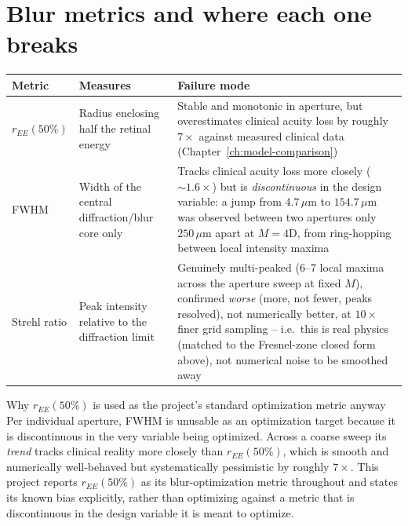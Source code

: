 \section{Blur metrics and where each one breaks}
\label{sec:blur-metrics}
\begin{center}
\begin{tabular}{p{2.6cm}p{4.8cm}p{6.0cm}}
\toprule
Metric & Measures & Failure mode \\
\midrule
$r_{EE}(50\%)$ & Radius enclosing half the retinal energy & Stable and monotonic in
aperture, but overestimates clinical acuity loss by roughly $7\times$ against measured
clinical data (Chapter~\ref{ch:model-comparison}) \\
FWHM & Width of the central diffraction/blur core only & Tracks clinical acuity loss
more closely ($\sim1.6\times$) but is \emph{discontinuous} in the design variable: a
jump from $4.7\,\mu$m to $154.7\,\mu$m was observed between two apertures only
$250\,\mu$m apart at $M=4$D, from ring-hopping between local intensity maxima \\
Strehl ratio & Peak intensity relative to the diffraction limit & Genuinely
multi-peaked (6--7 local maxima across the aperture sweep at fixed $M$), confirmed
\emph{worse} (more, not fewer, peaks resolved), not numerically better, at $10\times$
finer grid sampling -- i.e.\ this is real physics (matched to the Fresnel-zone
closed form above), not numerical noise to be smoothed away \\
\bottomrule
\end{tabular}
\end{center}

\begin{keybox}{Why $r_{EE}(50\%)$ is used as the project's standard optimization metric anyway}
Per individual aperture, FWHM is unusable as an optimization target because it is
discontinuous in the very variable being optimized. Across a coarse sweep its
\emph{trend} tracks clinical reality more closely than $r_{EE}(50\%)$, which is smooth
and numerically well-behaved but systematically pessimistic by roughly $7\times$. This
project reports $r_{EE}(50\%)$ as its blur-optimization metric throughout and states its
known bias explicitly, rather than optimizing against a metric that is discontinuous in
the design variable it is meant to optimize.
\end{keybox}

